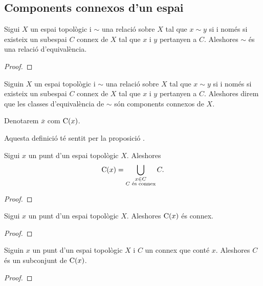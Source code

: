 \documentclass[../Apunts.tex]{subfiles}
\begin{document}
	\subsection{Components connexos d'un espai}
	\begin{proposition}
		\label{prop:components connexos}
		Sigui \(X\) un espai topològic i \(\sim\) una relació sobre \(X\) tal que \(x\sim y\) si i només si existeix un subespai \(C\) connex de \(X\) tal que \(x\) i \(y\) pertanyen a \(C\). Aleshores \(\sim\) és una relació d'equivalència.
		\begin{proof}
		\end{proof}
	\end{proposition}
	\begin{definition}
		\label{def:compontents connexos}
		Siguin \(X\) un espai topològic i \(\sim\) una relació sobre \(X\) tal que \(x\sim y\) si i només si existeix un subespai \(C\) connex de \(X\) tal que \(x\) i \(y\) pertanyen a \(C\). Aleshores direm que les classes d'equivalència de \(\sim\) són components connexos de \(X\).
		
		Denotarem \(\overline{x}\) com \(\mathrm{C}(x)\).
		
		Aquesta definició té sentit per la proposició .
	\end{definition}
	\begin{proposition}
		\label{prop:el component connex d'un punt és la unió dels connexos que el contenen}
		Sigui \(x\) un punt d'un espai topològic \(X\). Aleshores
		\[\mathrm{C}(x)=\bigcup_{\substack{x\in C\\C\text{ és connex}}}C.\] %
		\begin{proof}
		\end{proof}
	\end{proposition}
	\begin{proposition}
		\label{prop:el component connex d'un punt és connex}
		Sigui \(x\) un punt d'un espai topològic \(X\). Aleshores \(\mathrm{C}(x)\) és connex.
		\begin{proof}
		\end{proof}
	\end{proposition}
	\begin{proposition}
		\label{prop:el component connex d'un punt conté tots els connexos que contenen el punt}
		Siguin \(x\) un punt d'un espai topològic \(X\) i \(C\) un connex que conté \(x\). Aleshores \(C\) és un subconjunt de \(\mathrm{C}(x)\).
		\begin{proof}
		\end{proof}
	\end{proposition}
\end{document}
